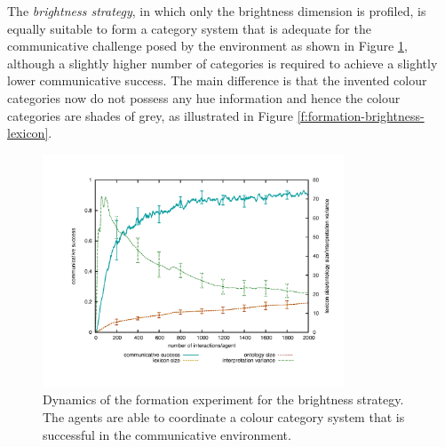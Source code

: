 The \emph{brightness strategy}, in which only the brightness dimension
is profiled, is equally suitable to form a category system that is
adequate for the communicative challenge posed by the environment as
shown in Figure \ref{f:formation-brightness-dynamics}, although a
slightly higher number of categories is required to achieve a slightly
lower communicative success. The main difference is that the invented
colour categories now do not possess any hue information and hence the
colour categories are shades of grey, as illustrated in Figure
\ref{f:formation-brightness-lexicon}.

\begin{figure}[htbp]
  \begin{center}
    \includegraphics[width=0.8\textwidth]{./basic-operators/figures/formation-brightness.pdf}
    \caption[Dynamics of the formation experiment for the brightness
    strategy]{Dynamics of the formation experiment for the brightness
      strategy. The agents are able to coordinate a colour category
      system that is successful in the communicative environment.}
    \label{f:formation-brightness-dynamics}
  \end{center}
\end{figure}

